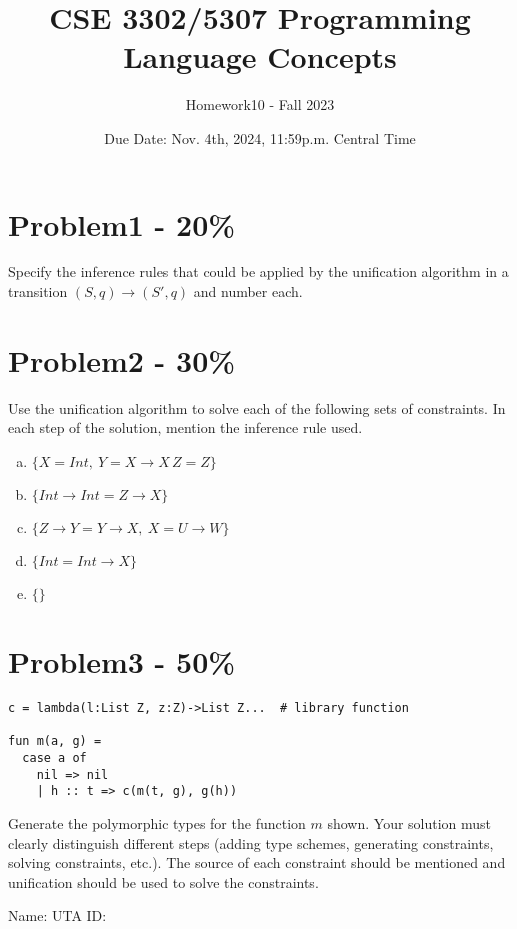 \documentclass{article}
\newcommand{\answerboxbig}{
    \vspace{20cm} %
}
\newcommand{\studentinfo}{
    \noindent Name: \underline{\hspace{5cm}} UTA ID: \underline{\hspace{5cm}}\\
    \vspace{0.5cm} %
}
\begin{document}
\title{CSE 3302/5307 Programming Language Concepts}
\author{Homework10 - Fall 2023}
\date{Due Date: Nov. 4th, 2024, 11:59p.m. Central Time}
\maketitle
\thispagestyle{fancy}


\section*{Problem1 - 20\%}

Specify the inference rules that could be applied by the unification algorithm in a transition $(S,q)\rightarrow(S',q)$ and number each.

\answerboxbig

\section*{Problem2 - 30\%}

Use the unification algorithm to solve each of the following sets of constraints. In each step of the solution, mention the inference rule used.
	\begin{enumerate}[(a)]
		\item $\{X = Int,\ Y = X\rightarrow X\, Z=Z\}$
		\item $\{Int\rightarrow Int = Z\rightarrow X\}$
		\item $\{Z\rightarrow Y = Y\rightarrow X,\ X = U\rightarrow W\}$
		\item $\{Int = Int\rightarrow X\}$
		\item $\{\}$
	\end{enumerate} 

\answerboxbig

\section*{Problem3 - 50\%}

\begin{lstlisting}
c = lambda(l:List Z, z:Z)->List Z...  # library function

fun m(a, g) =
  case a of
    nil => nil
    | h :: t => c(m(t, g), g(h))
\end{lstlisting}


\noindent
Generate the polymorphic types for the function $m$ shown. Your solution must clearly distinguish different steps (adding type schemes, generating constraints, solving constraints, etc.). The source of each constraint should be mentioned and unification should be used to solve the constraints.

\answerboxbig

\newpage 
\mbox{}
\newpage 




\studentinfo
\end{document}
